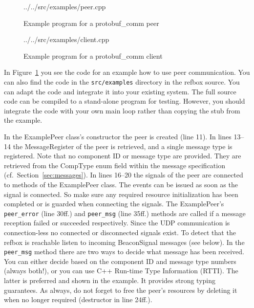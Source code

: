 \documentclass[a4paper]{article}
\newcommand{\refsec}[1]{Section~\ref{#1}}
\newcommand{\reffig}[1]{Figure~\ref{#1}}
\begin{document}
\begin{figure}
  
    {../../src/examples/peer.cpp}
\caption{Example program for a protobuf\_comm peer}
\label{fig:example-peer}
\end{figure}
\begin{figure}
  
    {../../src/examples/client.cpp}
\caption{Example program for a protobuf\_comm client}
\label{fig:example-client}
\end{figure}
In \reffig{fig:example-peer} you see the code for an example how to
use peer communication. You can also find the code in the
\texttt{src/examples} directory in the refbox source. You can adapt
the code and integrate it into your existing system. The full source
code can be compiled to a stand-alone program for testing. However,
you should integrate the code with your own main loop rather than
copying the stub from the example.

In the ExamplePeer class's constructor the peer is created (line
11). In lines 13--14 the MessageRegister of the peer is retrieved, and
a single message type is registered. Note that no component ID or
message type are provided. They are retrieved from the CompType enum
field within the message specification (cf.~\refsec{sec:messages}). In
lines 16--20 the signals of the peer are connected to methods of the
ExamplePeer class. The events can be issued as soon as the signal is
connected. So make sure any required resource initialization has been
completed or is guarded when connecting the signals. The ExamplePeer's
\texttt{peer\_error} (line 30ff.) and \texttt{peer\_msg} (line 35ff.)
methods are called if a message reception failed or succeeded
respectively. Since the UDP communication is connection-less no
connected or disconnected signals exist. To detect that the refbox is
reachable listen to incoming BeaconSignal messages (see below). In the
\texttt{peer\_msg} method there are two ways to decide what message
has been received. You can either decide based on the component ID and
message type numbers (always both!), or you can use C++ Run-time Type
Information (RTTI). The latter is preferred and shown in the
example. It provides strong typing guarantees. As always, do not
forget to free the peer's resources by deleting it when no longer
required (destructor in line 24ff.).
\end{document}
